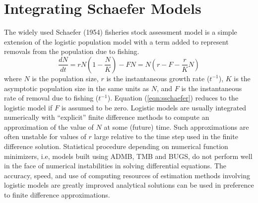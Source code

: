 \section{Integrating Schaefer Models}
\label{sec:schaefer}
The widely used Schaefer (1954) fisheries stock assessment model 
is a simple
extension of the logistic population model with a term added to
represent removals from the population due to fishing.
\begin{equation}
\label{eqn:sschaefer}
\frac{dN}{dt} = rN(1-\frac{N}{K}) - FN = N(r-F-\frac{r}{K}N)
\end{equation}
where $N$ is the population size,
$r$ is the instantaneous growth rate ($t^{-1}$),
$K$ is the asymptotic population size in the same units as $N$,
and $F$ is the instantaneous rate of removal due to fishing ($t^{-1}$).
Equation (\ref{eqn:sschaefer}) reduces to the logistic model
if $F$ is assumed to be zero.
Logistic models are usually integrated numerically with
``explicit'' finite difference methods to compute an approximation 
of the value of $N$ at some (future) time. 
Such approximations are often unstable for values of $r$ large
relative to the time step used in the finite difference solution.
Statistical procedure depending on numerical function
minimizers, i.e, models built using ADMB, TMB and BUGS,
do not perform well in the face of numerical instabilities in solving
differential equations.
The accuracy, speed, and use of computing resources of 
estimation methods involving logistic models are
greatly improved analytical solutions can be used in preference
to finite difference approximations. 

